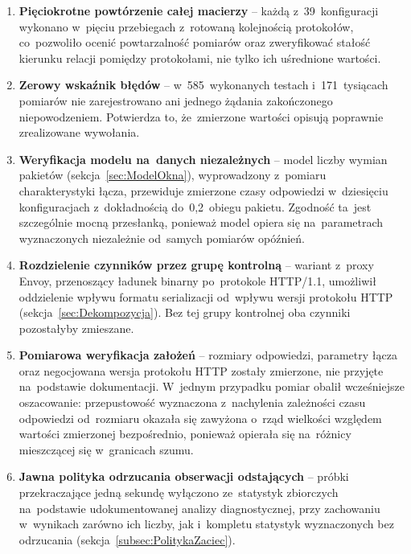 \begin{enumerate}
    \item \textbf{Pięciokrotne powtórzenie całej macierzy} -- każdą z~39~konfiguracji wykonano w~pięciu przebiegach z~rotowaną kolejnością protokołów, co~pozwoliło ocenić powtarzalność pomiarów oraz zweryfikować stałość kierunku relacji pomiędzy protokołami, nie tylko ich uśrednione wartości.

    \item \textbf{Zerowy wskaźnik błędów} -- w~585~wykonanych testach i~171~tysiącach pomiarów nie zarejestrowano ani jednego żądania zakończonego niepowodzeniem. Potwierdza to, że~zmierzone wartości opisują poprawnie zrealizowane wywołania.

    \item \textbf{Weryfikacja modelu na~danych niezależnych} -- model liczby wymian pakietów (sekcja~\ref{sec:ModelOkna}), wyprowadzony z~pomiaru charakterystyki łącza, przewiduje zmierzone czasy odpowiedzi w~dziesięciu konfiguracjach z~dokładnością do~0,2~obiegu pakietu. Zgodność ta~jest szczególnie mocną przesłanką, ponieważ model opiera się na~parametrach wyznaczonych niezależnie od~samych pomiarów opóźnień.

    \item \textbf{Rozdzielenie czynników przez grupę kontrolną} -- wariant z~proxy Envoy, przenoszący ładunek binarny po~protokole HTTP/1.1, umożliwił oddzielenie wpływu formatu serializacji od~wpływu wersji protokołu HTTP (sekcja~\ref{sec:Dekompozycja}). Bez tej grupy kontrolnej oba czynniki pozostałyby zmieszane.

    \item \textbf{Pomiarowa weryfikacja założeń} -- rozmiary odpowiedzi, parametry łącza oraz negocjowana wersja protokołu HTTP zostały zmierzone, nie przyjęte na~podstawie dokumentacji. W~jednym przypadku pomiar obalił wcześniejsze oszacowanie: przepustowość wyznaczona z~nachylenia zależności czasu odpowiedzi od~rozmiaru okazała się zawyżona o~rząd wielkości względem wartości zmierzonej bezpośrednio, ponieważ opierała się na~różnicy mieszczącej się w~granicach szumu.

    \item \textbf{Jawna polityka odrzucania obserwacji odstających} -- próbki przekraczające jedną sekundę wyłączono ze~statystyk zbiorczych na~podstawie udokumentowanej analizy diagnostycznej, przy zachowaniu w~wynikach zarówno ich liczby, jak i~kompletu statystyk wyznaczonych bez odrzucania (sekcja~\ref{subsec:PolitykaZaciec}).


\end{enumerate}
